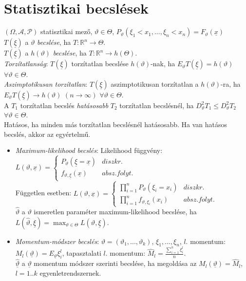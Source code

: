 \documentclass[margin=0px]{article}
\begin{document}
\section{Statisztikai becslések}

$(\Omega, \mathcal{A}, \mathcal{P})$ statisztikai mező, $\vartheta \in \Theta$, $P_{\vartheta}(\xi_1<x_1,...,\xi_n<x_n) = F_{\vartheta}(\underline{x})$ \\
$T(\underline{\xi})$ a $\vartheta$ \textit{becslése}, ha $T: \mathbb{R}^n \to \Theta$. \\
$T(\underline{\xi})$ a $h(\vartheta)$ \textit{becslése}, ha $T: \mathbb{R}^n \to h(\Theta)$. \\
\textit{Torzítatlanság}: $T(\underline{\xi})$ torzítatlan becslése $h(\vartheta)$-nak, ha $E_{\vartheta}T(\underline{\xi}) = h(\vartheta)$ $\forall \vartheta \in \Theta$. \\
\textit{Aszimptotikusan torzítatlan}: $T(\underline{\xi})$ aszimptotikusan torzítatlan a $h(\vartheta)$-ra, ha $E_{\vartheta}T(\underline{\xi}) \to h(\vartheta)$ $(n \to \infty)$ $\forall \vartheta \in \Theta$. \\
A $T_1$ torzítatlan becslés \textit{hatásosabb} $T_2$ torzítatlan becslésnél, ha $D_{\vartheta}^{2}T_1 \leq D_{\vartheta}^{2}T_2$ $\forall \vartheta \in \Theta$. \\
Hatásos, ha minden más torzítatlan becslésnél hatásosabb. Ha van hatásos becslés, akkor az egyértelmű.

\begin{itemize}
    \item \textit{Maximum-likelihood becslés}: Likelihood függvény: $L(\vartheta, \underline{x}) = \left\{\begin{array} {lr}
                  P_{\vartheta}(\underline{\xi} = \underline{x}) & diszkr.      \\
                  f_{\vartheta, \underline{\xi}}(\underline{x})  & absz. folyt.
              \end{array}\right.$ \\
          Független esetben: $L(\vartheta, \underline{x}) = \left\{\begin{array} {lr}
                  \prod_{i=1}^{n}{P_{\vartheta}(\xi_i = x_i)} & diszkr.      \\
                  \prod_{i=1}^{n}{f_{\vartheta, \xi_i}(x_i)}  & absz. folyt.
              \end{array}\right.$\\
          $\hat{\vartheta}$ a $\vartheta$ ismeretlen paraméter maximum-likelihood becslése, ha $L(\hat{\vartheta},\underline{\xi}) = \max_{\vartheta \in \Theta}{L(\vartheta,\underline{\xi})}$.
    \item \textit{Momentum-módszer becslés}: $\vartheta = (\vartheta_1, ..., \vartheta_k)$, $\xi_1, ..., \xi_n$, $l.$ momentum: $M_l(\underline{\vartheta}) = E_{\underline{\vartheta}}\xi_{i}^{l}$, tapasztalati $l.$ momentum: $\hat{M}_l = \frac{\sum_{i=1}^{n}{\xi_i^l}}{n}$. \\ $\hat{\underline{\vartheta}}$ a $\underline{\vartheta}$ momentum módszer szerinti becslése, ha megoldása az $M_l(\underline{\vartheta}) = \hat{M}_l$, $l=1..k$ egyenletrendszernek.
\end{itemize}
\end{document}

